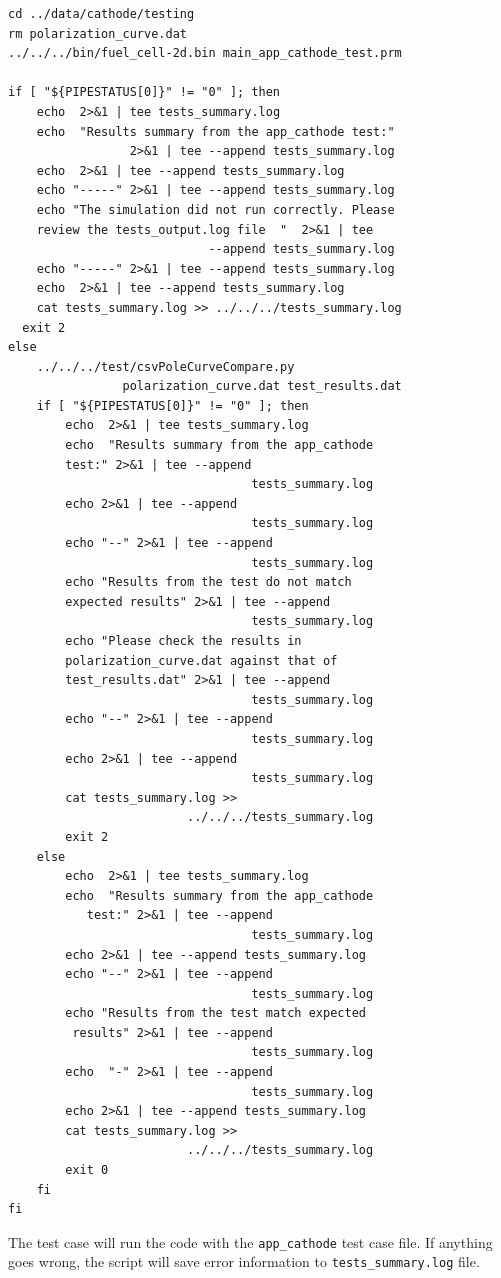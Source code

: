 \small \begin{lstlisting}
cd ../data/cathode/testing
rm polarization_curve.dat
../../../bin/fuel_cell-2d.bin main_app_cathode_test.prm

if [ "${PIPESTATUS[0]}" != "0" ]; then
	echo  2>&1 | tee tests_summary.log
	echo  "Results summary from the app_cathode test:"
	             2>&1 | tee --append tests_summary.log
	echo  2>&1 | tee --append tests_summary.log
	echo "-----" 2>&1 | tee --append tests_summary.log
	echo "The simulation did not run correctly. Please
	review the tests_output.log file  "  2>&1 | tee
	                        --append tests_summary.log
	echo "-----" 2>&1 | tee --append tests_summary.log
	echo  2>&1 | tee --append tests_summary.log
	cat tests_summary.log >> ../../../tests_summary.log 
  exit 2
else
	../../../test/csvPoleCurveCompare.py
	            polarization_curve.dat test_results.dat
	if [ "${PIPESTATUS[0]}" != "0" ]; then
		echo  2>&1 | tee tests_summary.log
		echo  "Results summary from the app_cathode
		test:" 2>&1 | tee --append
		                          tests_summary.log
		echo 2>&1 | tee --append
		                          tests_summary.log
		echo "--" 2>&1 | tee --append
		                          tests_summary.log
		echo "Results from the test do not match
		expected results" 2>&1 | tee --append
		                          tests_summary.log
		echo "Please check the results in
		polarization_curve.dat against that of
		test_results.dat" 2>&1 | tee --append
		                          tests_summary.log
		echo "--" 2>&1 | tee --append
		                          tests_summary.log
		echo 2>&1 | tee --append
		                          tests_summary.log
		cat tests_summary.log >>
		                 ../../../tests_summary.log 
		exit 2
	else 
		echo  2>&1 | tee tests_summary.log
		echo  "Results summary from the app_cathode
		   test:" 2>&1 | tee --append
		                          tests_summary.log
		echo 2>&1 | tee --append tests_summary.log
		echo "--" 2>&1 | tee --append
		                          tests_summary.log
		echo "Results from the test match expected
		 results" 2>&1 | tee --append
		                          tests_summary.log
		echo  "-" 2>&1 | tee --append
		                          tests_summary.log
		echo 2>&1 | tee --append tests_summary.log
		cat tests_summary.log >>
		                 ../../../tests_summary.log 
		exit 0
	fi
fi
\end{lstlisting}\normalsize

The test case will run the code with the \verb!app_cathode! test case file. If anything goes wrong, the script will save error information to \verb!tests_summary.log! file.

